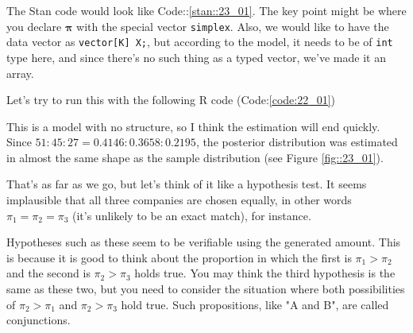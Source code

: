 \documentclass{ltjsbook}
\begin{document}
The Stan code would look like Code::\ref{stan::23_01}. The key point might be where you declare $\bm{\pi}$ with the special vector \verb|simplex|. Also, we would like to have the data vector as \verb|vector[K] X;|, but according to the model, it needs to be of \verb|int| type here, and since there's no such thing as a typed vector, we've made it an array.

Let's try to run this with the following R code (Code:\ref{code:22_01})

This is a model with no structure, so I think the estimation will end quickly. Since $51:45:27 = 0.4146:0.3658:0.2195$, the posterior distribution was estimated in almost the same shape as the sample distribution (see Figure \ref{fig::23_01}).

That's as far as we go, but let's think of it like a hypothesis test. It seems implausible that all three companies are chosen equally, in other words $\pi_1=\pi_2=\pi_3$ (it's unlikely to be an exact match), for instance.

Hypotheses such as these seem to be verifiable using the generated amount. This is because it is good to think about the proportion in which the first is $\pi_1 > \pi_2$ and the second is $\pi_2 > \pi_3$ holds true.
You may think the third hypothesis is the same as these two, but you need to consider the situation where both possibilities of $\pi_2 > \pi_1$ and $\pi_2>\pi_3$ hold true. Such propositions, like "A and B", are called conjunctions.
\end{document}
